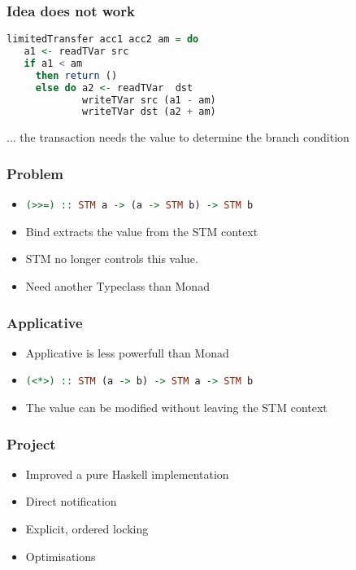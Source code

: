 \documentclass{beamer}
\begin{document}
  \begin{frame}[fragile]
   \frametitle{Idea does not work}
   \begin{lstlisting}[language=Haskell]
limitedTransfer acc1 acc2 am = do
   a1 <- readTVar src
   if a1 < am
     then return ()
     else do a2 <- readTVar  dst
             writeTVar src (a1 - am)
             writeTVar dst (a2 + am)
   \end{lstlisting}
   \vfill
    ... the transaction needs the value to determine the branch condition
\end{frame}

  \begin{frame}[fragile]
   \frametitle{Problem}
      \begin{itemize}\setlength\itemsep{1em}
       \item\lstinline[language=Haskell]{(>>=) :: STM a -> (a -> STM b) -> STM b}
       \item Bind extracts the value from the STM context
       \item STM no longer controls this value.
       \item Need another Typeclass than Monad
      \end{itemize}
\end{frame}


  \begin{frame}[fragile]
   \frametitle{Applicative}
      \begin{itemize}\setlength\itemsep{1em}
       \item Applicative is less powerfull than Monad
       \item\lstinline[language=Haskell]{(<*>) :: STM (a -> b) -> STM a -> STM b}
       \item The value can be modified without leaving the STM context
      \end{itemize}
\end{frame}

  
  \begin{frame}
   \frametitle{Project}
   \begin{itemize}\setlength\itemsep{1em}
    \item Improved a pure Haskell implementation
    \item Direct notification
    \item Explicit, ordered locking
    \item Optimisations
   \end{itemize}
  \end{frame}
\end{document}
